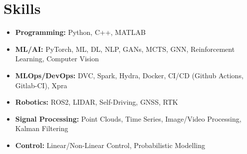 \documentclass[]{resume}
\begin{document}
\section*{\sectionformat Skills}
\begin{itemize}[leftmargin=*, itemsep=-2pt, parsep=0pt, label={}]
	\item \textbf{Programming:} Python, C++, MATLAB
	\item \textbf{ML/AI:} PyTorch, ML, DL, NLP, GANs, MCTS, GNN, Reinforcement Learning, Computer Vision
	\item \textbf{MLOps/DevOps:} DVC, Spark, Hydra, Docker, CI/CD (Github Actions, Gitlab-CI), Xpra
	\item \textbf{Robotics:} ROS2, LIDAR, Self-Driving, GNSS, RTK
	\item \textbf{Signal Processing:} Point Clouds, Time Series, Image/Video Processing, Kalman Filtering
	\item \textbf{Control:} Linear/Non-Linear Control, Probabilistic Modelling
\end{itemize}
\end{document}
